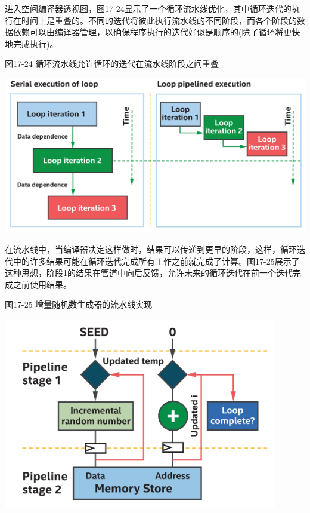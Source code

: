 进入空间编译器透视图，图17-24显示了一个循环流水线优化，其中循环迭代的执行在时间上是重叠的。不同的迭代将彼此执行流水线的不同阶段，而各个阶段的数据依赖可以由编译器管理，以确保程序执行的迭代好似是顺序的(除了循环将更快地完成执行)。\par

\hspace*{\fill} \par %
图17-24 循环流水线允许循环的迭代在流水线阶段之间重叠
\begin{center}
	\includegraphics[width=1.0\textwidth]{content/chapter-17/images/19}
\end{center}

在流水线中，当编译器决定这样做时，结果可以传递到更早的阶段，这样，循环迭代中的许多结果可能在循环迭代完成所有工作之前就完成了计算。图17-25展示了这种思想，阶段1的结果在管道中向后反馈，允许未来的循环迭代在前一个迭代完成之前使用结果。\par

\hspace*{\fill} \par %
图17-25 增量随机数生成器的流水线实现
\begin{center}
	\includegraphics[width=0.9\textwidth]{content/chapter-17/images/20}
\end{center}

